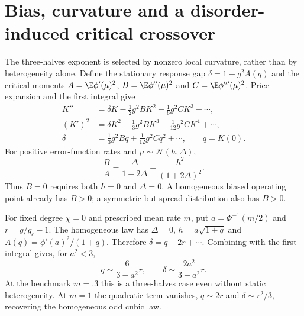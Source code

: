 \section{Bias, curvature and a disorder-induced critical crossover}
The three-halves exponent is selected by nonzero local curvature, rather than
by heterogeneity alone. Define the stationary response gap
$\delta=1-g^2A(q)$ and the critical moments
$A=\E\phi'(\mu)^2$, $B=\E\phi''(\mu)^2$ and
$C=\E\phi'''(\mu)^2$. Price expansion and the first integral give
\begin{align*}
 K''&=\delta K-\tfrac12g^2BK^2-\tfrac16g^2CK^3+\cdots,\\
 (K')^2&=\delta K^2-\tfrac13g^2BK^3-\tfrac1{12}g^2CK^4+\cdots,\\
 \delta&=\tfrac13g^2Bq+\tfrac1{12}g^2Cq^2+\cdots,\qquad q=K(0).
\end{align*}
For positive error-function rates and $\mu\sim\mathcal N(h,\Delta)$,
\[
 \frac BA=\frac{\Delta}{1+2\Delta}
              +\frac{h^2}{(1+2\Delta)^2}.
\]
Thus $B=0$ requires both $h=0$ and $\Delta=0$. A homogeneous biased operating
point already has $B>0$; a symmetric but spread distribution also has $B>0$.

For fixed degree $\chi=0$ and prescribed mean rate $m$, put
$a=\Phi^{-1}(m/2)$ and $r=g/g_c-1$. The homogeneous law has
$\Delta=0$, $h=a\sqrt{1+q}$ and $A(q)=\phi'(a)^2/(1+q)$. Therefore
$\delta=q-2r+\cdots$. Combining with the first integral gives, for $a^2<3$,
\[
 q\sim\frac6{3-a^2}r,\qquad
 \delta\sim\frac{2a^2}{3-a^2}r.
\]
At the benchmark $m=.3$ this is a three-halves case even without static
heterogeneity. At $m=1$ the quadratic term vanishes, $q\sim2r$ and
$\delta\sim r^2/3$, recovering the homogeneous odd cubic law.

